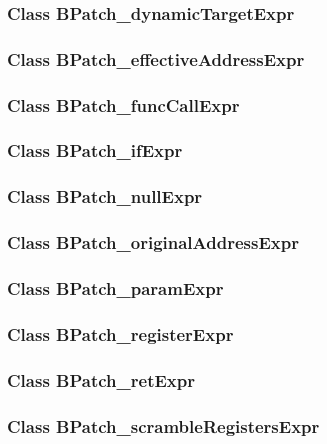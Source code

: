 \subsubsection{Class BPatch\_dynamicTargetExpr}


\subsubsection{Class BPatch\_effectiveAddressExpr}


\subsubsection{Class BPatch\_funcCallExpr}


\subsubsection{Class BPatch\_ifExpr}


\subsubsection{Class BPatch\_nullExpr}


\subsubsection{Class BPatch\_originalAddressExpr}


\subsubsection{Class BPatch\_paramExpr}


\subsubsection{Class BPatch\_registerExpr}


\subsubsection{Class BPatch\_retExpr}


\subsubsection{Class BPatch\_scrambleRegistersExpr}


